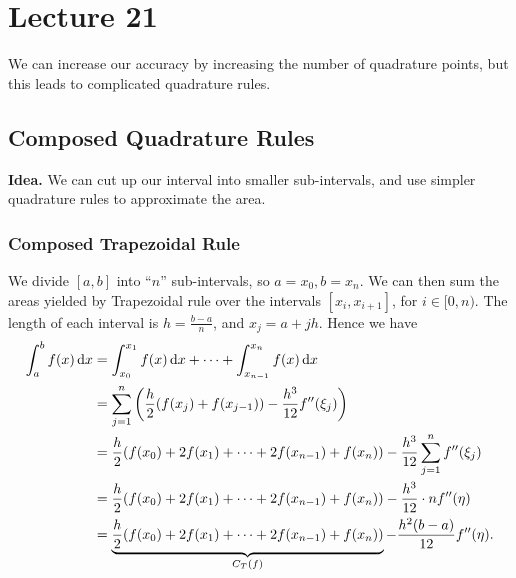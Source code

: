 \documentclass[class=article, crop=false]{standalone}
\begin{document}
  \section{Lecture 21}
  \begin{note}{}
    We can increase our accuracy by increasing the number of quadrature points, but this leads to complicated quadrature rules.
  \end{note}
  \subsection{Composed Quadrature Rules}
  \textbf{Idea.} We can cut up our interval into smaller sub-intervals, and use simpler quadrature rules to approximate the area.
  \subsubsection{Composed Trapezoidal Rule}
  We divide $[a, b]$ into ``$n$'' sub-intervals, so $a = x_0, b = x_n$. We can then sum the areas yielded by Trapezoidal rule over the intervals $[x_i, x_{i + 1}]$, for $i\in [0, n)$. The length of each interval is $h = \frac{b - a}{n}$, and $x_j = a + jh$. Hence we have
  \begin{align*}
    \int_{a}^{b}f(x) \,\mathrm dx &= \int_{x_0}^{x_1}f(x) \,\mathrm dx + \dotsb + \int_{x_{n - 1}}^{x_n}f(x) \,\mathrm dx \\
                                  &= \sum_{j=1}^{n} \left( \frac{h}{2}(f(x_j) + f(x_{j - 1})) - \frac{h^3}{12}f''(\xi_j) \right) \\
                                  &= \frac{h}{2}(f(x_0) + 2f(x_1) + \dotsb + 2f(x_{n - 1}) + f(x_n)) - \frac{h^3}{12}\sum_{j=1}^{n}f''(\xi_j) \\
                                  &= \frac{h}{2}(f(x_0) + 2f(x_1) + \dotsb + 2f(x_{n - 1}) + f(x_n)) - \frac{h^3}{12}\cdot nf''(\eta) \\
                                  &= \underbrace{\frac{h}{2}(f(x_0) + 2f(x_1) + \dotsb + 2f(x_{n - 1}) + f(x_n))}_{C_T(f)} - \frac{h^2(b - a)}{12}f''(\eta).
  \end{align*}
\end{document}
